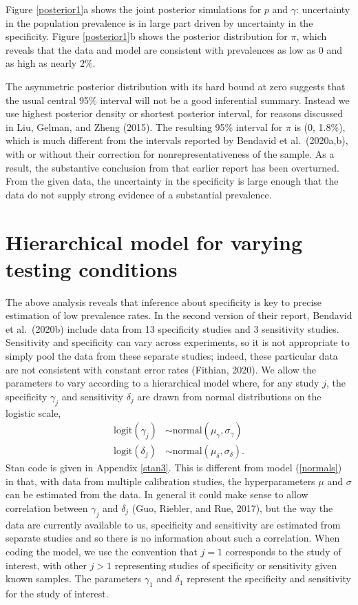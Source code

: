 \documentclass[11pt]{article}
\begin{document}
Figure \ref{posterior1}a shows the joint posterior simulations for $p$ and $\gamma$:  uncertainty in the population prevalence is in large part driven by uncertainty in the specificity.  Figure \ref{posterior1}b shows the posterior distribution for $\pi$, which reveals that the data and model are consistent with prevalences as low as 0 and as high as nearly 2\%.

The asymmetric posterior distribution with its hard bound at zero suggests that the usual central 95\% interval will not be a good inferential summary.  Instead we use highest posterior density or shortest posterior interval, for reasons discussed in Liu, Gelman, and Zheng (2015). The resulting 95\% interval for $\pi$ is (0, 1.8\%), which is much different from the intervals reported by Bendavid et al.\ (2020a,b), with or without their correction for nonrepresentativeness of the sample.  As a result, the substantive conclusion from that earlier report has been overturned. From the given data, the uncertainty in the specificity is large enough that the data do not supply strong evidence of a substantial prevalence.

\section{Hierarchical model for varying testing conditions}\label{model2}
The above analysis reveals that inference about specificity is key to precise estimation of low prevalence rates.  In the second version of their report, Bendavid et al.\ (2020b) include data from 13 specificity studies and 3 sensitivity studies.  Sensitivity and specificity can vary across experiments, so it is not appropriate to simply pool the data from these separate studies; indeed, these particular data are not consistent with constant error rates (Fithian, 2020). We allow the parameters to vary according to a hierarchical model where, for any study $j$, the specificity $\gamma_j$ and sensitivity $\delta_j$ are drawn from normal distributions on the logistic scale,
\begin{align*}
  \mbox{logit}(\gamma_j) & \sim \mbox{normal}(\mu_{\gamma}, \sigma_{\gamma})\\
 \mbox{logit}(\delta_j) & \sim \mbox{normal}(\mu_{\delta}, \sigma_{\delta}).
\end{align*}
Stan code is given in Appendix \ref{stan3}.
This is different from model (\ref{normals}) in that, with data from multiple calibration studies, the hyperparameters $\mu$ and $\sigma$ can be estimated from the data.  In general it could make sense to allow correlation between $\gamma_j$ and $\delta_j$ (Guo, Riebler, and Rue, 2017), but the way the data are currently available to us, specificity and sensitivity are estimated from separate studies and so there is no information about such a correlation.  When coding the model, we use the convention that $j=1$ corresponds to the study of interest, with other $j > 1$ representing studies of specificity or sensitivity given known samples.  The parameters $\gamma_1$ and $\delta_1$ represent the specificity and sensitivity for the study of interest.
\end{document}
